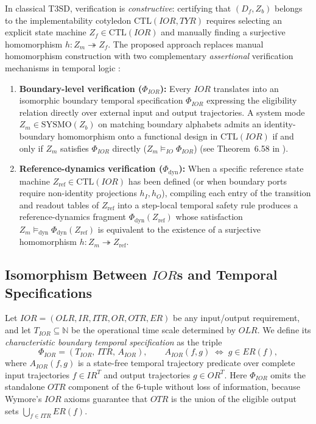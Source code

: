 In classical T3SD, verification is \emph{constructive}: certifying that $(D_f,Z_b)$ belongs to the implementability cotyledon $\mathrm{CTL}(IOR,TYR)$ requires selecting an explicit state machine $Z_f\in\mathrm{CTL}(IOR)$ and manually finding a surjective homomorphism $h:Z_m\twoheadrightarrow Z_f$. The proposed approach replaces manual homomorphism construction with two complementary \emph{assertional} verification mechanisms in temporal logic \citep{Pnueli1977,MannaPnueli1995}:
\begin{enumerate}
    \item \textbf{Boundary-level verification ($\Phi_{IOR}$):} Every $IOR$ translates into an isomorphic boundary temporal specification $\Phi_{IOR}$ expressing the eligibility relation directly over external input and output trajectories. A system mode $Z_m\in\mathrm{SYSMO}(Z_b)$ on matching boundary alphabets admits an identity-boundary homomorphism onto a functional design in $\mathrm{CTL}(IOR)$ if and only if $Z_m$ satisfies $\Phi_{IOR}$ directly ($Z_m\models_{IO}\Phi_{IOR}$) (see Theorem~6.58 in \citet{Wymore1993}).
    \item \textbf{Reference-dynamics verification ($\Phi_{\mathrm{dyn}}$):} When a specific reference state machine $Z_{\mathrm{ref}}\in\mathrm{CTL}(IOR)$ has been defined (or when boundary ports require non-identity projections $h_I,h_O$), compiling each entry of the transition and readout tables of $Z_{\mathrm{ref}}$ into a step-local temporal safety rule produces a reference-dynamics fragment $\Phi_{\mathrm{dyn}}(Z_{\mathrm{ref}})$ whose satisfaction $Z_m\models_{\mathrm{dyn}}\Phi_{\mathrm{dyn}}(Z_{\mathrm{ref}})$ is equivalent to the existence of a surjective homomorphism $h:Z_m\twoheadrightarrow Z_{\mathrm{ref}}$.
\end{enumerate}

\subsection{Isomorphism Between \texorpdfstring{$IOR$s}{IORs} and Temporal Specifications}
\label{sec:trace-observability}
Let $IOR=(OLR,IR,ITR,OR,OTR,ER)$ be any input/output requirement, and let $T_{IOR}\subseteq\mathbb{N}$ be the operational time scale determined by $OLR$. We define its \emph{characteristic boundary temporal specification} as the triple
\begin{equation}
  \Phi_{IOR}=(T_{IOR},\,ITR,\,A_{IOR}),
  \qquad
  A_{IOR}(f,g)\;\Longleftrightarrow\;g\in ER(f),
  \label{eq:phi-ior-def}
\end{equation}
where $A_{IOR}(f,g)$ is a state-free temporal trajectory predicate over complete input trajectories $f\in IR^T$ and output trajectories $g\in OR^T$. Here $\Phi_{IOR}$ omits the standalone $OTR$ component of the 6-tuple without loss of information, because Wymore's $IOR$ axioms guarantee that $OTR$ is the union of the eligible output sets $\bigcup_{f\in ITR}ER(f)$.

